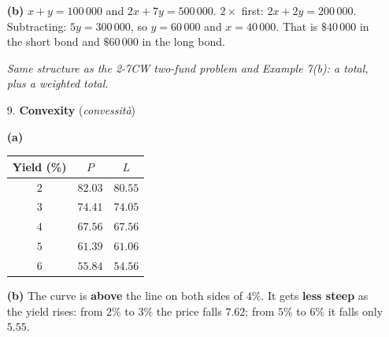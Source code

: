 \documentclass[12pt, twoside]{article}
\newcommand{\ita}[1]{(\emph{#1})}
\begin{document}
\begin{enumerate}[itemsep=0.3cm]
\textbf{(b)} $x + y = 100\,000$ and $2x + 7y = 500\,000$.
$2 \times$ first: $2x + 2y = 200\,000$. Subtracting: $5y = 300\,000$, so
$y = 60\,000$ and $x = 40\,000$. That is $\$40\,000$ in the short bond and
$\$60\,000$ in the long bond.

\emph{Same structure as the 2-7CW two-fund problem and Example 7(b): a
total, plus a weighted total.}

\item[9.] \textbf{Convexity} \ita{convessità}

\begin{minipage}[t]{0.42\linewidth}
\textbf{(a)}

\renewcommand{\arraystretch}{1.25}
\begin{tabular}{|c|c|c|}
  \hline
  Yield (\%) & $P$ & $L$ \\ \hline
  $2$ & $82.03$ & $80.55$ \\ \hline
  $3$ & $74.41$ & $74.05$ \\ \hline
  $4$ & $67.56$ & $67.56$ \\ \hline
  $5$ & $61.39$ & $61.06$ \\ \hline
  $6$ & $55.84$ & $54.56$ \\ \hline
\end{tabular}
\end{minipage}
\hfill
\begin{minipage}[t]{0.55\linewidth}
\vspace{0pt}
\end{minipage}

\textbf{(b)} The curve is \textbf{above} the line on both sides of $4\%$.
It gets \textbf{less steep} as the yield rises: from $2\%$ to $3\%$ the
price falls $7.62$; from $5\%$ to $6\%$ it falls only $5.55$.


\end{enumerate}
\end{document}
